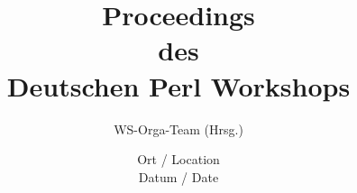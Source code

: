 \documentclass[11pt,a4paper,twoside,headsepline]{scrartcl}
\begin{document}
\title{Proceedings \\ des \\ Deutschen Perl Workshops}
\author{WS-Orga-Team (Hrsg.)}
\date{Ort / Location \\ Datum / Date}
\maketitle
\tableofcontents


\newpage



\newpage



\newpage



\printindex
\end{document}

